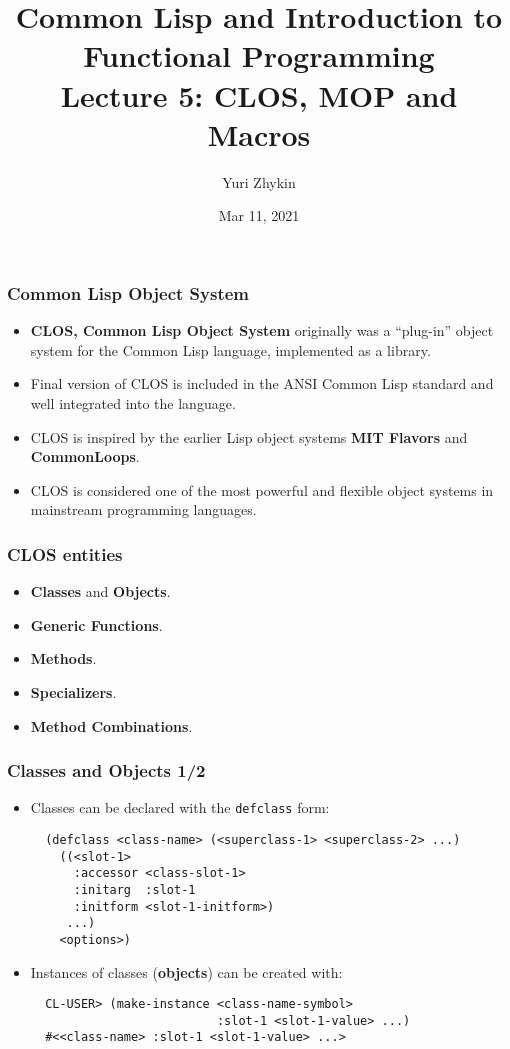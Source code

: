 \documentclass{beamer}
\title{
  Common Lisp and Introduction to Functional Programming \\
  Lecture 5: CLOS, MOP and Macros
}
\author{Yuri Zhykin}
\date{Mar 11, 2021}
\begin{document}
\frame{\titlepage}

\begin{frame}[fragile]
  \frametitle{Common Lisp Object System}
  \begin{itemize}
  \item \textbf{CLOS, Common Lisp Object System} originally was a ``plug-in''
    object system for the Common Lisp language, implemented as a library.
  \item Final version of CLOS is included in the ANSI Common Lisp standard and
    well integrated into the language.
  \item CLOS is inspired by the earlier Lisp object systems \textbf{MIT Flavors}
    and \textbf{CommonLoops}.
  \item CLOS is considered one of the most powerful and flexible object systems
    in mainstream programming languages.
  \end{itemize}
\end{frame}

\begin{frame}[fragile]
  \frametitle{CLOS entities}
  \begin{itemize}
  \item \textbf{Classes} and \textbf{Objects}.
  \item \textbf{Generic Functions}.
  \item \textbf{Methods}.
  \item \textbf{Specializers}.
  \item \textbf{Method Combinations}.
  \end{itemize}
\end{frame}

\begin{frame}[fragile]
  \frametitle{Classes and Objects 1/2}
  \begin{itemize}
  \item Classes can be declared with the \texttt{defclass} form:
\begin{verbatim}
  (defclass <class-name> (<superclass-1> <superclass-2> ...)
    ((<slot-1> 
      :accessor <class-slot-1>
      :initarg  :slot-1
      :initform <slot-1-initform>)
     ...)
    <options>)
\end{verbatim}
  \item Instances of classes (\textbf{objects}) can be created with:
\begin{verbatim}
  CL-USER> (make-instance <class-name-symbol>
                          :slot-1 <slot-1-value> ...)
  #<<class-name> :slot-1 <slot-1-value> ...>
\end{verbatim}    
  \end{itemize}
\end{frame}
\end{document}
